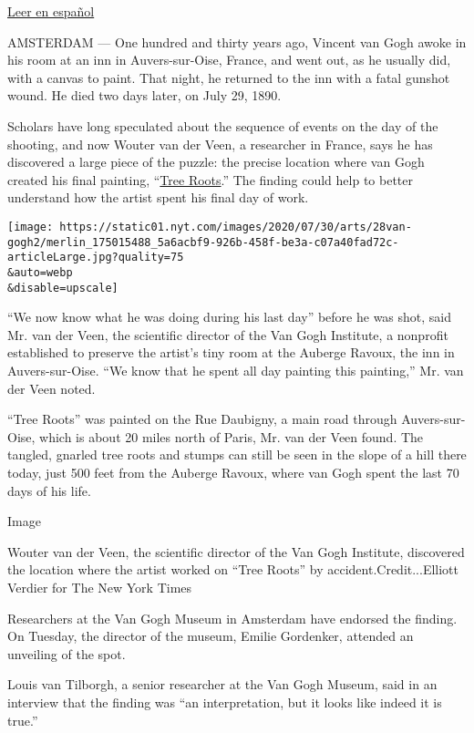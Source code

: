 \href{https://www.nytimes.com/es/2020/07/29/espanol/cultura/vincent-van-gogh-raices-arbol.html}{Leer
en español}

AMSTERDAM --- One hundred and thirty years ago, Vincent van Gogh awoke
in his room at an inn in Auvers-sur-Oise, France, and went out, as he
usually did, with a canvas to paint. That night, he returned to the inn
with a fatal gunshot wound. He died two days later, on July 29, 1890.

Scholars have long speculated about the sequence of events on the day of
the shooting, and now Wouter van der Veen, a researcher in France, says
he has discovered a large piece of the puzzle: the precise location
where van Gogh created his final painting,
``\href{https://www.vangoghmuseum.nl/en/collection/s0195V1962}{Tree
Roots}.'' The finding could help to better understand how the artist
spent his final day of work.

\texttt{[image: https://static01.nyt.com/images/2020/07/30/arts/28van-gogh2/merlin\_175015488\_5a6acbf9-926b-458f-be3a-c07a40fad72c-articleLarge.jpg?quality=75\\\&auto=webp\\\&disable=upscale]}

``We now know what he was doing during his last day'' before he was
shot, said Mr. van der Veen, the scientific director of the Van Gogh
Institute, a nonprofit established to preserve the artist's tiny room at
the Auberge Ravoux, the inn in Auvers-sur-Oise. ``We know that he spent
all day painting this painting,'' Mr. van der Veen noted.

``Tree Roots'' was painted on the Rue Daubigny, a main road through
Auvers-sur-Oise, which is about 20 miles north of Paris, Mr. van der
Veen found. The tangled, gnarled tree roots and stumps can still be seen
in the slope of a hill there today, just 500 feet from the Auberge
Ravoux, where van Gogh spent the last 70 days of his life.

Image

Wouter van der Veen, the scientific director of the Van Gogh Institute,
discovered the location where the artist worked on ``Tree Roots'' by
accident.Credit...Elliott Verdier for The New York Times

Researchers at the Van Gogh Museum in Amsterdam have endorsed the
finding. On Tuesday, the director of the museum, Emilie Gordenker,
attended an unveiling of the spot.

Louis van Tilborgh, a senior researcher at the Van Gogh Museum, said in
an interview that the finding was ``an interpretation, but it looks like
indeed it is true.''


